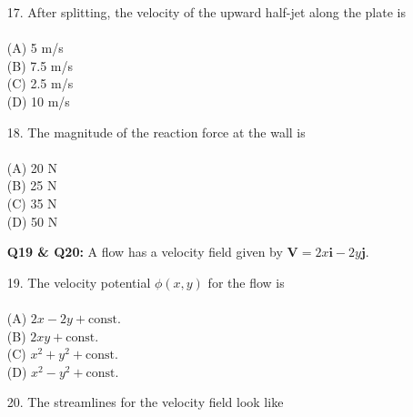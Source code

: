 \documentclass[journal,12pt,onecolumn]{IEEEtran}
\begin{document}
\begin{enumerate}
\item[17.] After splitting, the velocity of the upward half-jet along the plate is\\
\vspace{0.2cm}
\hfill{} \\
(A) 5 m/s\\
(B) 7.5 m/s\\
(C) 2.5 m/s\\
(D) 10 m/s
\vspace{0.5cm}

\item[18.] The magnitude of the reaction force at the wall is\\
\vspace{0.2cm}
\hfill{} \\
(A) 20 N\\
(B) 25 N\\
(C) 35 N\\
(D) 50 N
\vspace{0.5cm}

\newpage 
 
\item[\textbf{Q19 \& Q20:}]
A flow has a velocity field given by $\mathbf{V} = 2x \mathbf{i} - 2y \mathbf{j}$.\\

\item[19.] The velocity potential $\phi(x, y)$ for the flow is\\
\vspace{0.2cm}
\hfill{} \\
(A) $2x - 2y + \text{const.}$\\
(B) $2xy + \text{const.}$\\
(C) $x^2 + y^2 + \text{const.}$\\
(D) $x^2 - y^2 + \text{const.}$
\vspace{1.0cm}

\item[20.] The streamlines for the velocity field look like\\
\vspace{0.2cm}
\hfill{} \\


\end{enumerate}
\end{document}
